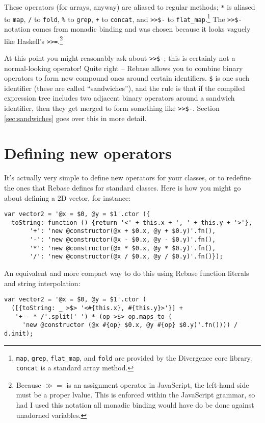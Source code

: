 \documentclass{report}
\begin{document}
      These operators (for arrays, anyway) are aliased to regular methods; \verb|*| is aliased to \verb|map|, \verb|/| to \verb|fold|, \verb|%| to \verb|grep|, \verb|+| to \verb|concat|, and
      \verb|>>$-| to \verb|flat_map|.\footnote{{\tt map}, {\tt grep}, {\tt flat\_map}, and {\tt fold} are provided by the Divergence core library. {\tt concat} is a standard array method.} The
      \verb|>>$-| notation comes from monadic binding and was chosen because it looks vaguely like Haskell's \verb|>>=|.\footnote{Because $\gg=$ is an assignment operator in JavaScript, the
      left-hand side must be a proper lvalue. This is enforced within the JavaScript grammar, so had I used this notation all monadic binding would have do be done against unadorned
      variables.}

      At this point you might reasonably ask about \verb|>>$-|; this is certainly not a normal-looking operator! Quite right -- Rebase allows you to combine binary operators to form new compound
      ones around certain identifiers. \verb|$| is one such identifier (these are called ``sandwiches''), and the rule is that if the compiled expression tree includes two adjacent binary
      operators around a sandwich identifier, then they get merged to form something like \verb|>>$-|. Section \ref{sec:sandwiches} goes over this in more detail.

\section {Defining new operators}
      It's actually very simple to define new operators for your classes, or to redefine the ones that Rebase defines for standard classes. Here is how you might go about defining a 2D vector,
      for instance:

\begin{verbatim}
var vector2 = '@x = $0, @y = $1'.ctor ({
  toString: function () {return '<' + this.x + ', ' + this.y + '>'},
       '+': 'new @constructor(@x + $0.x, @y + $0.y)'.fn(),
       '-': 'new @constructor(@x - $0.x, @y - $0.y)'.fn(),
       '*': 'new @constructor(@x * $0.x, @y * $0.y)'.fn(),
       '/': 'new @constructor(@x / $0.x, @y / $0.y)'.fn()});
\end{verbatim}

      An equivalent and more compact way to do this using Rebase function literals and string interpolation:

\begin{verbatim}
var vector2 = '@x = $0, @y = $1'.ctor (
  ([{toString: _ >$> '<#{this.x}, #{this.y}>'}] +
   '+ - * /'.split(' ') * (op >$> op.maps_to (
     'new @constructor (@x #{op} $0.x, @y #{op} $0.y)'.fn()))) / d.init);
\end{verbatim}
\end{document}
